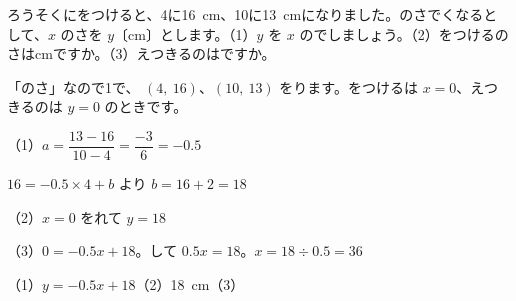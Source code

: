 \begin{reidai}[\R{場面}{ば|めん}から1\R{次関数}{じ|かん|すう}の\R{式}{しき}を\R{作}{つく}る]
ろうそくにをつけると、4に\qty{16}{cm}、10に\qty{13}{cm}になりました。のさでくなるとして、$x$ のさを $y$〔cm〕とします。（1）\nobreak $y$ を $x$ のでしましょう。（2）\nobreak {}をつけるのさはcmですか。（3）\nobreak {}えつきるのはですか。\par
\kangaekata 「のさ」なので1で、 $(4,\ 16)$、$(10,\ 13)$ をります。をつけるは $x=0$、えつきるのは $y=0$ のときです。\par
\shiki（1）\nobreak $a=\dfrac{13-16}{10-4}=\dfrac{-3}{6}=-0.5$\par
\hspace*{2.6\zw}\phantom{（1）}$16=-0.5\times4+b$ より $b=16+2=18$\par
\hspace*{2.6\zw}（2）\nobreak $x=0$ をれて $y=18$\par
\hspace*{2.6\zw}（3）\nobreak $0=-0.5x+18$。して $0.5x=18$。$x=18\div0.5=36$\par
\kotae（1）\nobreak $y=-0.5x+18$\quad（2）\nobreak \qty{18}{cm}\quad（3）
\end{reidai}


